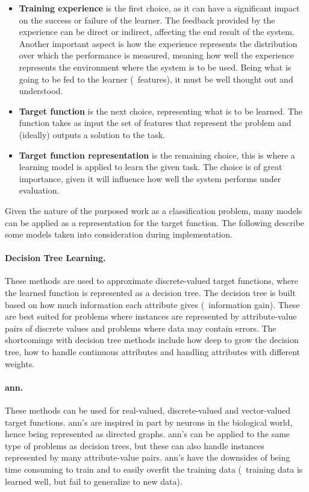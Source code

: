 \begin{itemize}
	\item \textbf{Training experience} is the first choice, as it can have a significant impact on the success or failure of the learner.
	The feedback provided by the experience can be direct or indirect, affecting the end result of the system.
	Another important aspect is how the experience represents the distribution over which the performance is measured, meaning how well the experience represents the environment where the system is to be used.
	Being what is going to be fed to the learner (\ie\ features), it must be well thought out and understood.
	\item \textbf{Target function} is the next choice, representing what is to be learned.
	The function takes as input the set of features that represent the problem and (ideally) outputs a solution to the task.
	\item \textbf{Target function representation} is the remaining choice, this is where a learning model is applied to learn the given task.
	The choice is of great importance, given it will influence how well the system performs under evaluation.
\end{itemize}

Given the nature of the purposed work as a classification problem, many models can be applied as a representation for the target function.
The following describe some models taken into consideration during implementation.

\paragraph{Decision Tree Learning.~\cite{mitchell:ml}} These methods are used to approximate discrete-valued target functions, where the learned function is represented as a decision tree.
The decision tree is built based on how much information each attribute gives (\ie\ information gain).
These are best suited for problems where instances are represented by attribute-value pairs of discrete values and problems where data may contain errors.
The shortcomings with decision tree methods include how deep to grow the decision tree, how to handle continuous attributes and handling attributes with different weights.

\paragraph{\gls{ann}.~\cite{mitchell:ml}} These methods can be used for real-valued, discrete-valued and vector-valued target functions.
\gls{ann}'s are inspired in part by neurons in the biological world, hence being represented as directed graphs.
\gls{ann}'s can be applied to the same type of problems as decision trees, but these can also handle instances represented by many attribute-value pairs.
\gls{ann}'s have the downsides of being time consuming to train and to easily overfit the training data (\ie\ training data is learned well, but fail to generalize to new data).

